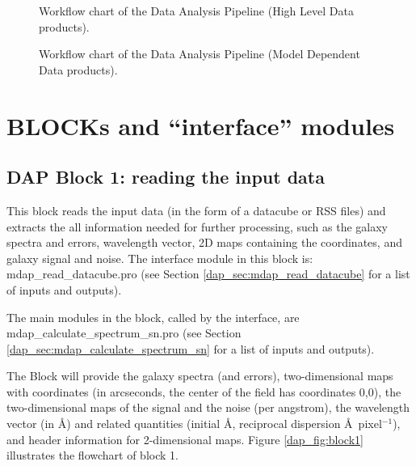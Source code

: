 \documentclass[11pt]{book}
\begin{document}
\begin{figure}
\begin{center}
\caption{Workflow chart of the Data Analysis Pipeline (High Level Data products).}
 \label{dap_fig:dap_workflow_1}
\end{center}
\end{figure}


\begin{figure}
\begin{center}
\caption{Workflow chart of the Data Analysis Pipeline (Model Dependent Data products).}
 \label{dap_fig:dap_workflow_2}
\end{center}
\end{figure}

\chapter{BLOCKs and ``interface'' modules}
\label{dap_chap:blocks}

\section{DAP Block 1: reading the input data}
\label{dap_sec:block1}

This block reads the input data (in the form of a datacube or RSS
files) and extracts the all information needed for further processing,
such as the galaxy spectra and errors, wavelength vector, 2D maps
containing the coordinates, and galaxy signal and noise. The interface
module in this block is: mdap\_read\_datacube.pro (see Section
\ref{dap_sec:mdap_read_datacube} for a list of inputs and outputs).

The main modules in the block, called by the interface, are
mdap\_calculate\_spectrum\_sn.pro (see Section
\ref{dap_sec:mdap_calculate_spectrum_sn} for a list of inputs and
outputs).

The Block will provide the galaxy spectra (and errors),
two-dimensional maps with coordinates (in arcseconds, the center of
the field has coordinates 0,0), the two-dimensional maps of the signal
and the noise (per angstrom), the wavelength vector (in \AA) and
related quantities (initial \AA, reciprocal dispersion
\AA\ pixel$^{-1}$), and header information for 2-dimensional
maps. Figure \ref{dap_fig:block1} illustrates the flowchart of block
1.
\end{document}
